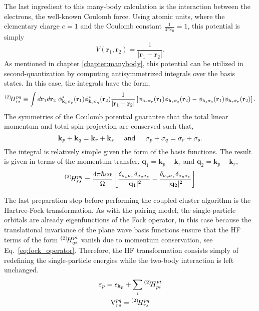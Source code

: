 \documentclass[thesis.tex]{subfiles}
\begin{document}
The last ingredient to this many-body calculation is the interaction between the electrons, the well-known Coulomb force.  Using atomic units, where the elementary charge $e = 1$ and the Coulomb constant $\frac{1}{4\pi\varepsilon_{0}} = 1$, this potential is simply
\begin{equation} \label{eq:coulomb}
  V\left( \mathbf{r}_{1}, \mathbf{r}_{2}\right) = \frac{1}{\lvert \mathbf{r}_{1} - \mathbf{r}_{2} \rvert}.
\end{equation}
As mentioned in chapter \ref{chapter:manybody}, this potential can be utilized in second-quantization by computing antisymmetrized integrals over the basis states.  In this case, the integrals have the form,
\begin{equation} \label{eq:coloumb_integral}
  {}^{\left(2\right)}\hspace{-2pt}H^{pq}_{rs} \equiv \int d\mathbf{r}_{1} d\mathbf{r}_{2}\  \phi^{*}_{\mathbf{k}_{p}\sigma_{p}}(\mathbf{r}_{1})\phi^{*}_{\mathbf{k}_{q}\sigma_{q}}(\mathbf{r}_{2}) \frac{1}{\lvert \mathbf{r}_{1} - \mathbf{r}_{2} \rvert} \left[\phi_{\mathbf{k}_{r}\sigma_{r}}(\mathbf{r}_{1})\phi_{\mathbf{k}_{s}\sigma_{s}}(\mathbf{r}_{2}) - \phi_{\mathbf{k}_{s}\sigma_{s}}(\mathbf{r}_{1})\phi_{\mathbf{k}_{r}\sigma_{r}}(\mathbf{r}_{2})\right].
\end{equation}
The symmetries of the Coulomb potential guarantee that the total linear momentum and total spin projection are conserved such that,
\begin{equation} \label{eq:coulomb-conserve}
  \mathbf{k}_{p} + \mathbf{k}_{q} = \mathbf{k}_{r} + \mathbf{k}_{s} \hspace{0.5cm} \text{and} \hspace{0.5cm} \sigma_{p} + \sigma_{q} = \sigma_{r} + \sigma_{s}.
\end{equation}
The integral is relatively simple given the form of the basis functions. The result is given in terms of the momentum transfer, $\mathbf{q}_{1} = \mathbf{k}_{p} - \mathbf{k}_{r}$ and $\mathbf{q}_{2} = \mathbf{k}_{p} - \mathbf{k}_{r}$,
\begin{equation} \label{eq:coulomb-int}
  {}^{\left(2\right)}\hspace{-2pt}H^{pq}_{rs} = \frac{4\pi \hbar c \alpha}{\Omega}\left[ \frac{\delta_{\sigma_{p}\sigma_{r}}\delta_{\sigma_{q}\sigma_{s}}}{\lvert \mathbf{q}_{1} \rvert^{2}} - \frac{\delta_{\sigma_{p}\sigma_{s}}\delta_{\sigma_{q}\sigma_{r}}}{\lvert \mathbf{q}_{2} \rvert^{2}} \right]
\end{equation}

The last preparation step before performing the coupled cluster algorithm is the Hartree-Fock transformation.  As with the pairing model, the single-particle orbitals are already eigenfunctions of the Fock operator, in this case because the translational invariance of the plane wave basis functions ensure that the HF terms of the form ${}^{\left(2\right)}\hspace{-2pt}H^{pi}_{qi}$ vanish due to momentum conservation, see Eq.\ \eqref{eq:fock_operator}.  Therefore, the HF transformation consists simply of redefining the single-particle energies while the two-body interaction is left unchanged.
\begin{gather}\label{eq:infinite_hf}
  \varepsilon_{p} = \epsilon_{\mathbf{k}_{p}} + \sum_{i}{}^{\left(2\right)}\hspace{-2pt}H^{pi}_{pi} \notag \\
  \text{V}^{pq}_{rs} = {}^{\left(2\right)}\hspace{-2pt}H^{pq}_{rs}
\end{gather}
\end{document}

